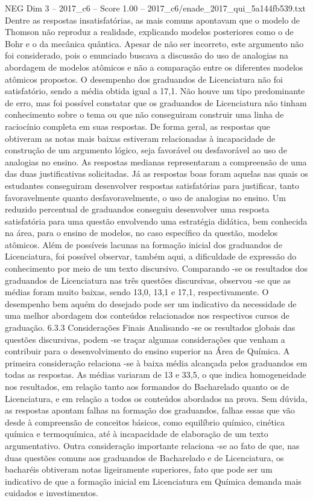 \begin{textsample}{NEG Dim 3 – 2017\_c6 – Score 1.00 – 2017\_c6/enade\_2017\_qui\_5a144fb539.txt}
Dentre as respostas insatisfatórias, as mais comuns apontavam que o modelo de Thomson não reproduz a realidade, explicando modelos posteriores como o de Bohr e o da mecânica quântica.
Apesar de não ser incorreto, este argumento não foi considerado, pois o enunciado buscava a discussão do uso de analogias na abordagem de modelos atômicos e não a comparação entre os diferentes modelos atômicos propostos.
O desempenho dos graduandos de Licenciatura não foi satisfatório, sendo a média obtida igual a 17,1.
Não houve um tipo predominante de erro, mas foi possível constatar que os graduandos de Licenciatura não tinham conhecimento sobre o tema ou que não conseguiram construir uma linha de raciocínio completa em suas respostas.
De forma geral, as respostas que obtiveram as notas mais baixas estiveram relacionadas à incapacidade de construção de um argumento lógico, seja favorável ou desfavorável ao uso de analogias no ensino.
As respostas medianas representaram a compreensão de uma das duas justificativas solicitadas.
Já as respostas boas foram aquelas nas quais os estudantes conseguiram desenvolver respostas satisfatórias para justificar, tanto favoravelmente quanto desfavoravelmente, o uso de analogias no ensino.
Um reduzido percentual de graduandos conseguiu desenvolver uma resposta satisfatória para uma questão envolvendo uma estratégia didática, bem conhecida na área, para o ensino de modelos, no caso específico da questão, modelos atômicos.
Além de possíveis lacunas na formação inicial dos graduandos de Licenciatura, foi possível observar, também aqui, a dificuldade de expressão do conhecimento por meio de um texto discursivo.
Comparando -se os resultados dos graduandos de Licenciatura nas três questões discursivas, observou -se que as médias foram muito baixas, sendo 13,0, 13,1 e 17,1, respectivamente.
O desempenho bem aquém do desejado pode ser um indicativo da necessidade de uma melhor abordagem dos conteúdos relacionados nos respectivos cursos de graduação. 6.3.3 Considerações Finais Analisando -se os resultados globais das questões discursivas, podem -se traçar algumas considerações que venham a contribuir para o desenvolvimento do ensino superior na Área de Química.
A primeira consideração relaciona -se à baixa média alcançada pelos graduandos em todas as respostas.
As médias variaram de 13 e 33,5, o que indica homogeneidade nos resultados, em relação tanto aos formandos do Bacharelado quanto os de Licenciatura, e em relação a todos os conteúdos abordados na prova.
Sem dúvida, as respostas apontam falhas na formação dos graduandos, falhas essas que vão desde à compreensão de conceitos básicos, como equilíbrio químico, cinética química e termoquímica, até à incapacidade de elaboração de um texto argumentativo.
Outra consideração importante relaciona -se ao fato de que, nas duas questões comuns aos graduandos de Bacharelado e de Licenciatura, os bacharéis obtiveram notas ligeiramente superiores, fato que pode ser um indicativo de que a formação inicial em Licenciatura em Química demanda mais cuidados e investimentos.

\end{textsample}
